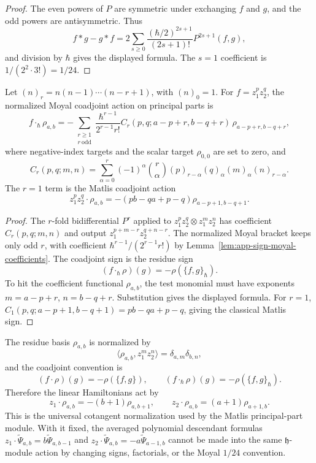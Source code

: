 \begin{proof}
  The even powers of \(P\) are symmetric under exchanging \(f\) and
  \(g\), and the odd powers are antisymmetric.  Thus
  \[
    f*g-g*f
      =
      2\sum_{s\ge0}
      \frac{(\hbar/2)^{2s+1}}{(2s+1)!}P^{2s+1}(f,g),
  \]
  and division by \(\hbar\) gives the displayed formula.  The
  \(s=1\) coefficient is \(1/(2^2\cdot3!)=1/24\).
\end{proof}

\begin{lem}
\label{lem:app-sign-moyal-coadjoint}
  Let \((n)_r=n(n-1)\cdots(n-r+1)\), with \((n)_0=1\).  For
  \(f=z_1^pz_2^q\), the normalized Moyal coadjoint action on principal
  parts is
  \[
    f\cdot_\hbar\rho_{a,b}
      =
      -\sum_{\substack{r\ge1\\ r\ \mathrm{odd}}}
      \frac{\hbar^{r-1}}{2^{r-1}r!}
      C_r(p,q;a-p+r,b-q+r)\,
      \rho_{a-p+r,b-q+r},
  \]
  where negative-index targets and the scalar target \(\rho_{0,0}\) are
  set to zero, and
  \[
    C_r(p,q;m,n)=
      \sum_{\alpha=0}^{r}(-1)^\alpha\binom r\alpha
      (p)_{r-\alpha}(q)_\alpha(m)_\alpha(n)_{r-\alpha}.
  \]
  The \(r=1\) term is the Matlis coadjoint action
  \[
    z_1^pz_2^q\cdot\rho_{a,b}
      =-(pb-qa+p-q)\rho_{a-p+1,b-q+1}.
  \]
\end{lem}

\begin{proof}
  The \(r\)-fold bidifferential \(P^r\) applied to
  \(z_1^pz_2^q\otimes z_1^mz_2^n\) has coefficient
  \(C_r(p,q;m,n)\) and output
  \(z_1^{p+m-r}z_2^{q+n-r}\).  The normalized Moyal bracket keeps only
  odd \(r\), with coefficient \(\hbar^{r-1}/(2^{r-1}r!)\) by
  Lemma~\ref{lem:app-sign-moyal-coefficients}.  The coadjoint sign is
  the residue sign
  \[
    (f\cdot_\hbar\rho)(g)=-\rho(\{f,g\}_\hbar).
  \]
  To hit the coefficient functional \(\rho_{a,b}\), the test monomial
  must have exponents \(m=a-p+r\), \(n=b-q+r\).  Substitution gives the
  displayed formula.  For \(r=1\),
  \(C_1(p,q;a-p+1,b-q+1)=pb-qa+p-q\), giving the classical Matlis sign.
\end{proof}

\begin{cor}
\label{cor:app-sign-universal-dual-normalization}
  The residue basis \(\rho_{a,b}\) is normalized by
  \[
    \langle\rho_{a,b},z_1^m z_2^n\rangle
      =\delta_{a,m}\delta_{b,n},
  \]
  and the coadjoint convention is
  \[
    (f\cdot\rho)(g)=-\rho(\{f,g\}),\qquad
    (f\cdot_\hbar\rho)(g)=-\rho(\{f,g\}_\hbar).
  \]
  Therefore the linear Hamiltonians act by
  \[
    z_1\cdot\rho_{a,b}=-(b+1)\rho_{a,b+1},\qquad
    z_2\cdot\rho_{a,b}=(a+1)\rho_{a+1,b}.
  \]
  This is the universal cotangent normalization used by the Matlis
  principal-part module.  With it fixed, the averaged polynomial
  descendant formulas
  \(z_1\cdot\widetilde\Psi_{a,b}=b\widetilde\Psi_{a,b-1}\) and
  \(z_2\cdot\widetilde\Psi_{a,b}=-a\widetilde\Psi_{a-1,b}\) cannot be made into the same
  \(\mathfrak h\)-module action by changing signs, factorials, or the
  Moyal \(1/24\) convention.
\end{cor}

